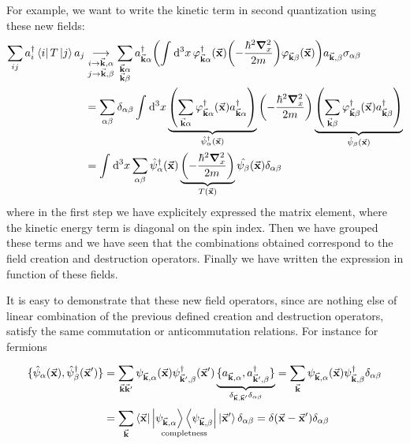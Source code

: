 \documentclass[../main/main.tex]{subfiles}
\begin{document}
For example, we want to write the kinetic term in second quantization using these new fields: 
\begin{equation*}
\begin{split}
  \sum_{ij}^{} a_i ^\dag \bra{i} T \ket{j} a_j & \underset{\substack{i \rightarrow \va{k}, \alpha  \\ j \rightarrow \va{k}, \beta } }{\longrightarrow}  \sum_{\substack{\va{k} \alpha  \\ \va{k} \beta } }^{} a_{\va{k} \alpha } ^\dag \qty(\int_{}^{} \dd[3]{x} \varphi _{\va{k} \alpha } ^\dag (\va{x}) \qty(- \frac{\hbar ^2 \grad _x^2}{2m}) \varphi _{\va{k} \beta } (\va{x}) )    a_{\va{k}, \beta } \sigma _{\alpha \beta } \\
  & = \sum_{\alpha \beta }^{} \delta _{ \alpha  \beta } \int_{}^{} \dd[3]{x} \underbrace{\qty(\sum_{\va{k} \alpha }^{} \varphi _{\va{k} \alpha } ^\dag (\va{x}) a_{\va{k} \alpha }^\dag  )    }_{\hat{\psi }_ \alpha ^\dag (\va{x}) } \qty(- \frac{\hbar ^2 \grad _x^2}{2m})
  \underbrace{\qty(\sum_{\va{k} \beta }^{} \varphi _{\va{k} \beta } ^\dag (\va{x}) a_{\va{k} \beta }^\dag  )    }_{\hat{\psi }_ \beta  (\va{x}) } \\
  & = \int_{}^{} \dd[3]{x} \sum_{\alpha \beta }^{} \hat{\psi }_ \alpha  ^\dag (\va{x})   \underbrace{\qty(- \frac{\hbar ^2 \grad _x^2}{2m}) }_{T (\va{x})} \hat{\psi _ \beta } (\va{x}) \delta _{\alpha \beta }
\end{split}
\end{equation*}
where in the first step we have explicitely expressed the matrix element, where the kinetic energy term is diagonal on the spin index. Then we have grouped these terms and we have seen that the combinations obtained correspond to the field creation and destruction operators. Finally we have written the expression in function of these fields.

It is easy to demonstrate that these new field operators, since are nothing else of linear combination of the previous defined creation and destruction operators, satisfy the same commutation or anticommutation relations. For instance for fermions
\begin{equation*}
\begin{split}
\{ \hat{\psi }_ \alpha (\va{x}), \hat{\psi }_ \beta ^\dag (\va{x}')   \}    &=  \sum_{\va{k} \va{k}'}^{}  \psi _{\va{k}, \alpha } (\va{x}) \psi _{\va{k}', \beta }^\dag (\va{x}')  \underbrace{\{ a_{\va{k}, \alpha }, a_{\va{k}', \beta } ^\dag  \} }_{ \delta _{\va{k},\va{k}'} \delta _{\alpha \beta }}  = \sum_{\va{k}}^{} \psi _{\va{k}, \alpha }(\va{x}) \psi _{\va{k}, \beta } ^\dag \delta _{\alpha \beta }  \\
& = \sum_{\va{k}}^{} \bra{\va{x}}  \underset{\text{completness}}{\ket{\psi _{\va{k}, \alpha }} \bra{\psi _{\va{k},\beta }}}  \ket{\va{x}'}  \delta _{\alpha \beta }
= \delta (\va{x}-\va{x}') \delta _{\alpha \beta }
\end{split}
\end{equation*}
\end{document}

